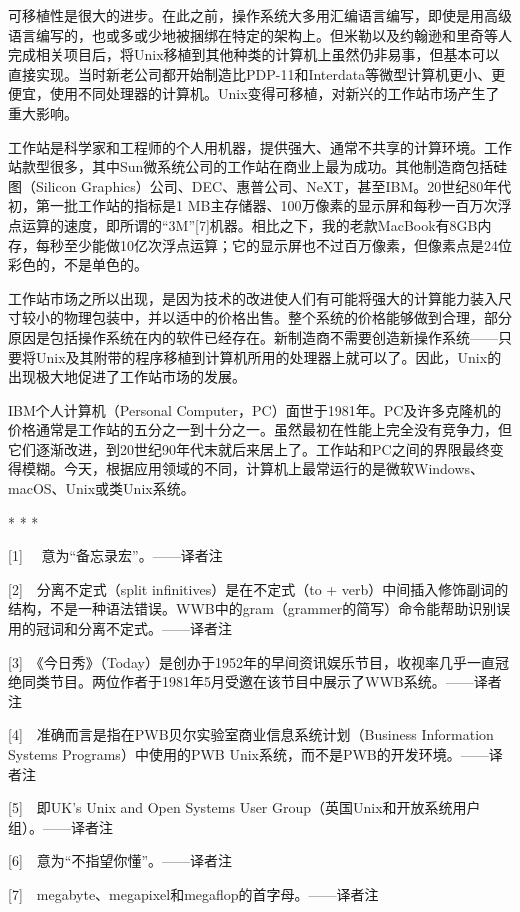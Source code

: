 \documentclass[a4paper,12pt,UTF8,twoside]{ctexbook}
\begin{document}
可移植性是很大的进步。在此之前，操作系统大多用汇编语言编写，即使是用高级语言编写的，也或多或少地被捆绑在特定的架构上。但米勒以及约翰逊和里奇等人完成相关项目后，将Unix移植到其他种类的计算机上虽然仍非易事，但基本可以直接实现。当时新老公司都开始制造比PDP-11和Interdata等微型计算机更小、更便宜，使用不同处理器的计算机。Unix变得可移植，对新兴的工作站市场产生了重大影响。

工作站是科学家和工程师的个人用机器，提供强大、通常不共享的计算环境。工作站款型很多，其中Sun微系统公司的工作站在商业上最为成功。其他制造商包括硅图（Silicon Graphics）公司、DEC、惠普公司、NeXT，甚至IBM。20世纪80年代初，第一批工作站的指标是1 MB主存储器、100万像素的显示屏和每秒一百万次浮点运算的速度，即所谓的“3M”[7]机器。相比之下，我的老款MacBook有8GB内存，每秒至少能做10亿次浮点运算；它的显示屏也不过百万像素，但像素点是24位彩色的，不是单色的。

工作站市场之所以出现，是因为技术的改进使人们有可能将强大的计算能力装入尺寸较小的物理包装中，并以适中的价格出售。整个系统的价格能够做到合理，部分原因是包括操作系统在内的软件已经存在。新制造商不需要创造新操作系统——只要将Unix及其附带的程序移植到计算机所用的处理器上就可以了。因此，Unix的出现极大地促进了工作站市场的发展。

IBM个人计算机（Personal Computer，PC）面世于1981年。PC及许多克隆机的价格通常是工作站的五分之一到十分之一。虽然最初在性能上完全没有竞争力，但它们逐渐改进，到20世纪90年代末就后来居上了。工作站和PC之间的界限最终变得模糊。今天，根据应用领域的不同，计算机上最常运行的是微软Windows、macOS、Unix或类Unix系统。



* * *



[1]　 意为“备忘录宏”。——译者注

[2]　分离不定式（split infinitives）是在不定式（to + verb）中间插入修饰副词的结构，不是一种语法错误。WWB中的gram（grammer的简写）命令能帮助识别误用的冠词和分离不定式。——译者注

[3]　《今日秀》（Today）是创办于1952年的早间资讯娱乐节目，收视率几乎一直冠绝同类节目。两位作者于1981年5月受邀在该节目中展示了WWB系统。——译者注

[4]　准确而言是指在PWB贝尔实验室商业信息系统计划（Business Information Systems Programs）中使用的PWB Unix系统，而不是PWB的开发环境。——译者注

[5]　即UK’s Unix and Open Systems User Group（英国Unix和开放系统用户组）。——译者注

[6]　意为“不指望你懂”。——译者注

[7]　megabyte、megapixel和megaflop的首字母。——译者注
\end{document}
